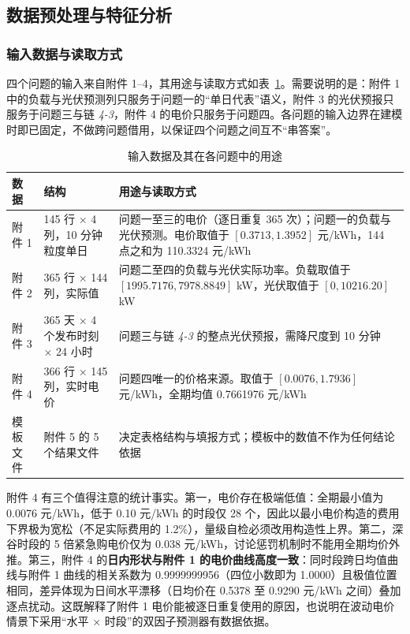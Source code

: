 \subsection{数据预处理与特征分析}

\subsubsection{输入数据与读取方式}

四个问题的输入来自附件 1--4，其用途与读取方式如表~\ref{tab:data}。需要说明的是：附件 1 中的负载与光伏预测列只服务于问题一的“单日代表”语义，附件 3 的光伏预报只服务于问题三与链 \emph{4-3}，附件 4 的电价只服务于问题四。各问题的输入边界在建模时即已固定，不做跨问题借用，以保证四个问题之间互不“串答案”。

\begin{table}[htbp]
\centering
\small
\caption{输入数据及其在各问题中的用途}
\label{tab:data}
\begin{tabular}{p{1.8cm}p{3.4cm}p{7.0cm}}
\toprule
数据 & 结构 & 用途与读取方式 \\
\midrule
附件 1 & 145 行 $\times$ 4 列，10 分钟粒度单日 & 问题一至三的电价（逐日重复 365 次）；问题一的负载与光伏预测。电价取值于 $[0.3713,1.3952]$ 元/kWh，144 点之和为 110.3324 元/kWh \\
附件 2 & 365 行 $\times$ 144 列，实际值 & 问题二至四的负载与光伏实际功率。负载取值于 $[1995.7176,7978.8849]$ kW，光伏取值于 $[0,10216.20]$ kW \\
附件 3 & 365 天 $\times$ 4 个发布时刻 $\times$ 24 小时 & 问题三与链 \emph{4-3} 的整点光伏预报，需降尺度到 10 分钟 \\
附件 4 & 366 行 $\times$ 145 列，实时电价 & 问题四唯一的价格来源。取值于 $[0.0076,1.7936]$ 元/kWh，全期均值 0.7661976 元/kWh \\
模板文件 & 附件 5 的 5 个结果文件 & 决定表格结构与填报方式；模板中的数值不作为任何结论依据 \\
\bottomrule
\end{tabular}
\end{table}

附件 4 有三个值得注意的统计事实。第一，电价存在极端低值：全期最小值为 0.0076 元/kWh，低于 0.10 元/kWh 的时段仅 28 个，因此以最小电价构造的费用下界极为宽松（不足实际费用的 1.2\%），量级自检必须改用构造性上界。第二，深谷时段的 5 倍紧急购电价仅为 0.038 元/kWh，讨论惩罚机制时不能用全期均价外推。第三，附件 4 的\textbf{日内形状与附件 1 的电价曲线高度一致}：同时段跨日均值曲线与附件 1 曲线的相关系数为 0.9999999956（四位小数即为 1.0000）且极值位置相同，差异体现为日间水平漂移（日均价在 0.5378 至 0.9290 元/kWh 之间）叠加逐点扰动。这既解释了附件 1 电价能被逐日重复使用的原因，也说明在波动电价情景下采用“水平 $\times$ 时段”的双因子预测器有数据依据。

